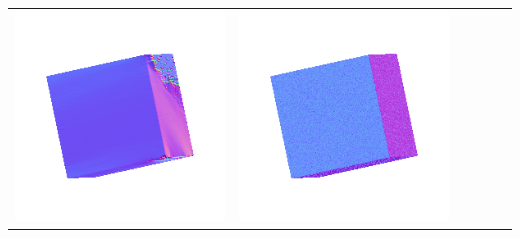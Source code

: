 \begin{tabularx}{\linewidth}{@{}Y@{}Y@{}Y@{}Y@{}Y@{}Y@{}}
\includegraphics[width=\linewidth]{semisynthetic/20150514_0_yu_out.png} &
\includegraphics[width=\linewidth]{semisynthetic/20150514_0_dpsn_out.png} &

\end{tabularx}
